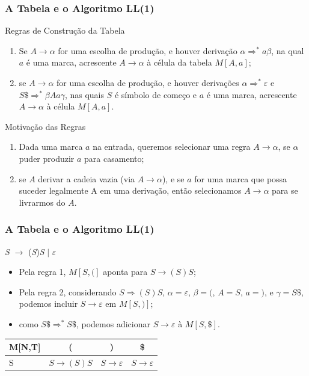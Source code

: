 \documentclass[table]{beamer}
\begin{document}
\begin{frame}
   \frametitle{A Tabela e o Algoritmo LL(1)}
   \begin{block}{Regras de Construção da Tabela}
      \begin{enumerate}
         \item Se $A\to\alpha$ for uma escolha de produção, e houver derivação $\alpha\Rightarrow^{*}a\beta$, na qual $a$ é uma marca, acrescente $A\to\alpha$ à célula da tabela $M[A, a]$;
	 \item se $A\to\alpha$ for uma escolha de produção, e houver derivações $\alpha\Rightarrow^{*}\varepsilon$ e $S\$\Rightarrow^{*}\beta Aa\gamma$, nas quais $S$ é símbolo de começo e $a$ é uma marca, acrescente $A\to\alpha$ à célula $M[A,a]$.
      \end{enumerate}
   \end{block}
   \begin{block}{Motivação das Regras}
      \begin{enumerate}
         \item Dada uma marca $a$ na entrada, queremos selecionar uma regra $A\to\alpha$, se $\alpha$ puder produzir $a$ para casamento;
	 \item se $A$ derivar a cadeia vazia (via $A\to\alpha$), e se $a$ for uma marca que possa suceder legalmente A em uma derivação, então selecionamos $A\to\alpha$ para se livrarmos do $A$.
      \end{enumerate}
   \end{block}
\end{frame}

\begin{frame}
   \frametitle{A Tabela e o Algoritmo LL(1)}
   \begin{center}
   \textit{S} $\to$ (\textit{S})\textit{S} $|$ $\varepsilon$
   \end{center}
   \begin{itemize}
      \item Pela regra 1, $M[S, (]$ aponta para $S\to(S)S$;
      \item Pela regra 2, considerando $S\Rightarrow(S)S$, $\alpha=\varepsilon$, $\beta=($, $A=S$, $a=)$, e $\gamma=S\$$, podemos incluir $S\to\varepsilon$ em $M[S,)]$;
      \item como $S\$\Rightarrow^{*}S\$$, podemos adicionar $S\to\varepsilon$ à $M[S,\$]$. 
   \end{itemize}

   \begin{table}
      \begin{tabular}{l|c c c}
      M[N,T]& ( & ) & \$\\
      \hline 
      S & $S\to(S)S$ & $S\to\varepsilon$ & $S\to\varepsilon$ \\
      \end{tabular}
   \end{table}
\end{frame}
\end{document}
